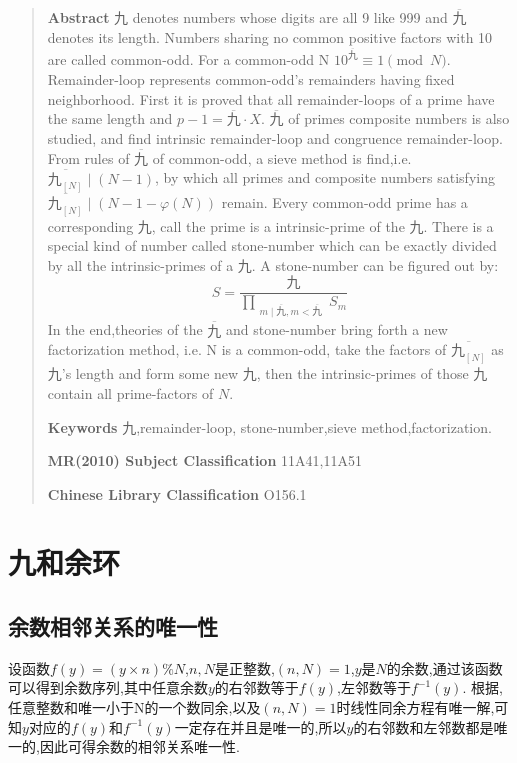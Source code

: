 \documentclass[a4paper]{article}
\numberwithin{equation}{section}
\begin{document}
\begin{quote}
\textbf{Abstract}  $九$ denotes numbers whose digits are all 9 like 999 and $\overline{九}$ denotes its length. 
Numbers sharing no common positive factors with 10 are called common-odd.
For a common-odd N $10^{\overline{九}} \equiv 1 \pmod{N}$.
Remainder-loop represents common-odd's remainders having fixed neighborhood. 
First it is proved that all remainder-loops of a prime have the same length and $p-1=\overline{九} \cdot X $.
$\overline{九}$ of primes  composite numbers is also studied, and find intrinsic remainder-loop and congruence remainder-loop.
From rules of  $\overline{九}$  of common-odd, a sieve method is find,i.e. $\overline{九_{[N]}} \mid (N-1)$, by which all primes and composite numbers satisfying $\overline{九_{[N]}} \mid (N-1-\varphi(N))$ remain.
Every common-odd prime has a corresponding $九$, call the prime is a intrinsic-prime of the $九$. There is a special kind of number called stone-number  which can be exactly divided by all the intrinsic-primes of a $九$. A stone-number can be figured out by:
\begin{displaymath}S=\frac{\displaystyle 九}
			{\displaystyle
			\prod_{\substack{m \mid \overline{九} ,m < \overline{九} }}S_{m}
			}
\end {displaymath}
In the end,theories of the $\overline{九}$ and stone-number bring forth a new factorization method, i.e.
N is a common-odd, take the factors of $\overline{九_{[N]}}$  as 九's length and form some new $九$, then the intrinsic-primes of those $九$ contain all prime-factors of $N$.

\textbf{Keywords} $九$,remainder-loop, stone-number,sieve method,factorization.

\textbf{MR(2010) Subject Classification} 11A41,11A51

\textbf{Chinese Library Classification} O156.1
\end{quote}

\section{九和余环}

\subsection{余数相邻关系的唯一性}
设函数$f(y)=(y\times n)\% N$,$n,N$是正整数,$(n,N)=1$,$y$是$N$的余数,通过该函数可以得到余数序列,其中任意余数$y$的右邻数等于$f(y)$,左邻数等于$f^{-1}(y)$.
根据\cite{ref1},任意整数和唯一小于N的一个数同余,以及$(n,N)=1$时线性同余方程有唯一解,可知$y$对应的$f(y)$和$f^{-1}(y)$一定存在并且是唯一的,所以$y$的右邻数和左邻数都是唯一的,因此可得余数的相邻关系唯一性.
\end{document}
